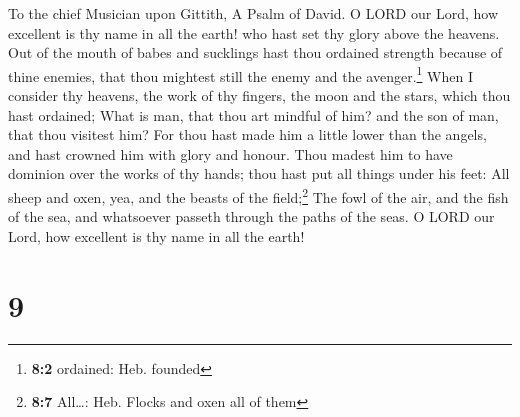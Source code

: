 To the chief Musician upon Gittith, A Psalm of David.  O
LORD our Lord, how excellent is thy name in all the earth! who hast set
thy glory above the heavens.  Out of the mouth of babes
and sucklings hast thou ordained strength because of thine enemies, that
thou mightest still the enemy and the avenger.\footnote{\textbf{8:2}
  ordained: Heb. founded}  When I consider thy heavens,
the work of thy fingers, the moon and the stars, which thou hast
ordained;  What is man, that thou art mindful of him? and
the son of man, that thou visitest him?  For thou hast
made him a little lower than the angels, and hast crowned him with glory
and honour.  Thou madest him to have dominion over the
works of thy hands; thou hast put all things under his feet:
 All sheep and oxen, yea, and the beasts of the
field;\footnote{\textbf{8:7} All\ldots: Heb. Flocks and oxen all of them}
 The fowl of the air, and the fish of the sea, and
whatsoever passeth through the paths of the seas.  O LORD
our Lord, how excellent is thy name in all the earth!

\hypertarget{section-8}{%
\section{9}\label{section-8}}

